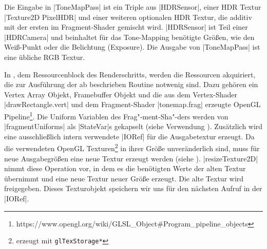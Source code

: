 Die Eingabe in |ToneMapPass| ist ein Triple aus |HDRSensor|, einer HDR Textur |Texture2D PixelHDR| und einer weiteren optionalen HDR Textur, die additiv mit der ersten im Fragment-Shader gemischt wird. |HDRSensor| ist Teil einer |HDRCamera| und beinhaltet für das Tone-Mapping benötigte Größen, wie den Weiß-Punkt oder die Belichtung (Exposure). Die Ausgabe von |ToneMapPass| ist eine übliche RGB Textur.


In , dem Ressourcenblock des Renderschritts, werden die Ressourcen akquiriert, die zur Ausführung der ab  beschrieben Routine notwenig sind. Dazu gehören ein Vertex Array Objekt, Framebuffer Objekt und die aus dem Vertex-Shader |drawRectangle.vert| und dem Fragment-Shader |tonemap.frag| erzeugte OpenGL Pipeline\footnote{https://www.opengl.org/wiki/GLSL\_Object\#Program\_pipeline\_objects}. Die Uniform Variablen des Frag"-ment-Sha"-ders werden von |fragmentUniforms| als |StateVar|s gekapselt (siehe Verwendung ). Zusätzlich wird eine ausschließlich intern verwendete |IORef| für die Ausgabetextur erzeugt. Da die verwendeten OpenGL Texturen\footnote{erzeugt mit \texttt{glTexStorage*}} in ihrer Größe unveränderlich sind, muss für neue Ausgabegrößen eine neue Textur erzeugt werden (siehe ). |resizeTexture2D| nimmt diese Operation vor, in dem es die benötigten Werte der alten Textur übernimmt und eine neue Textur neuer Größe erzeugt. Die alte Textur wird freigegeben. Dieses Texturobjekt speichern wir uns für den nächsten Aufruf in der |IORef|.

